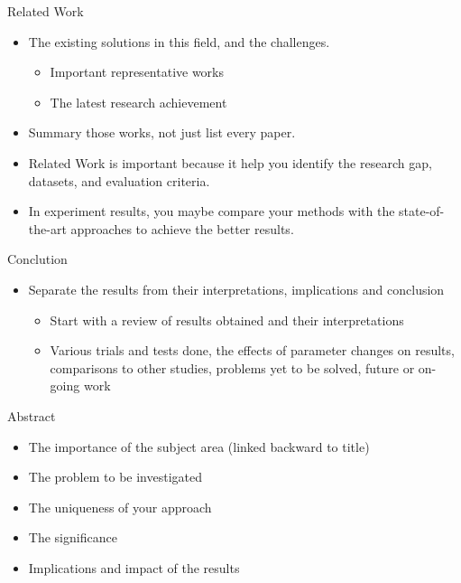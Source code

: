 \documentclass[
 size=14pt,
 paper=smartboard,  %
 mode=present, 		%
 display=slides, 	%
 style=tuliplab,  	%
 pauseslide,
 fleqn,leqno]{powerdot}{}
\begin{document}

\begin{slide}[toc=,bm=]{Related Work}
	\begin{itemize}
		\item The existing solutions in this field, and the challenges.
			\begin{itemize}
				\item Important representative works
				\item The latest research achievement 
			\end{itemize}		
		\item Summary those works, not just list every paper.
		\item Related Work is important because it help you identify the research gap, datasets, and evaluation criteria.	
		\item In experiment results, you maybe compare your methods with the state-of-the-art approaches to achieve the better results.
	\end{itemize}	
\end{slide}


\begin{slide}[toc=,bm=]{Conclution}
	\begin{itemize}
		\item Separate the results from their interpretations, implications and conclusion
			\begin{itemize}
				\item Start with a review of results obtained and their interpretations 
				\item Various trials and tests done, the effects of parameter changes on results, comparisons to other studies, problems yet to be solved, future or on-going work
			\end{itemize}
	\end{itemize}	
\end{slide}


\begin{slide}[toc=,bm=]{Abstract}
	\begin{itemize}
		\item The importance of the subject area (linked backward to title)
		\item The problem to be investigated
		\item The uniqueness of your approach 
		\item The significance
		\item Implications and impact of the results
	\end{itemize}	
\end{slide}
\end{document}
